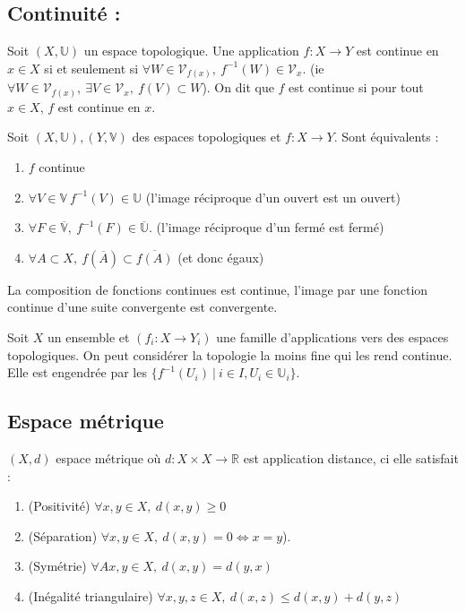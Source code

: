 \subsection{ Continuité :}
\begin{definition}
        Soit $(X,\mathbb{U})$ un espace topologique. Une application $f:X\to Y$ est continue en $x\in X$ si et seulement si $\forall W\in \mathcal{V}_{f(x)}, \ f^{-1}(W)\in \mathcal{V}_x$. (ie $\forall W\in \mathcal{V}_{f(x)},\ \exists V\in \mathcal{V}_x,\ f(V)\subset W$). On dit que $f$ est continue si pour tout $x\in X$, $f$ est continue en $x$. \\

\end{definition}
\begin{proposition}

    Soit $(X,\mathbb{U}), (Y,\mathbb{V})$ des espaces topologiques et $f:X\to Y$. Sont équivalents :
    \begin{enumerate}
        \item $f$ continue
        \item $\forall V\in \mathbb{V}\ f^{-1}(V)\in \mathbb{U}$ (l'image réciproque d'un ouvert est un ouvert)
        \item $\forall F \in \overline{\mathbb{V}},\ f^{-1}(F) \in \overline{\mathbb{U}}$. (l'image réciproque d'un fermé est fermé)
        \item $\forall A\subset X,\ f(\overline{A})\subset \overline{f(A)}$ (et donc égaux)
    \end{enumerate}
\end{proposition}

La composition de fonctions continues est continue, l'image par une fonction continue d'une suite convergente est convergente.
\begin{ex}
         Soit $X$ un ensemble et $(f_i:X\to Y_i)$ une famille d'applications vers des espaces topologiques. On peut considérer la topologie la moins fine qui les rend continue. Elle est engendrée par les $\{f^{-1}(U_i)\ |\ i\in I, U_i\in \mathbb{U}_i\}$.
\end{ex}

\subsection{Espace métrique}
\begin{definition}
    $(X,d)$ espace métrique où $d:X\times X\to \mathbb{R} $ est application distance, ci elle satisfait :
    \begin{enumerate}
        \item (Positivité) $\forall x,y \in X,\ d(x,y) \geq 0$
        \item(Séparation) $\forall x,y\in X, ~ d(x,y)=0\Leftrightarrow x=y$).
        \item (Symétrie) $\forall Ax,y\in X,\ d(x,y)=d(y,x)$
        \item (Inégalité triangulaire) $\forall x,y,z\in X,\ d(x,z)\le d(x,y)+d(y,z)$
    \end{enumerate}
\end{definition}

